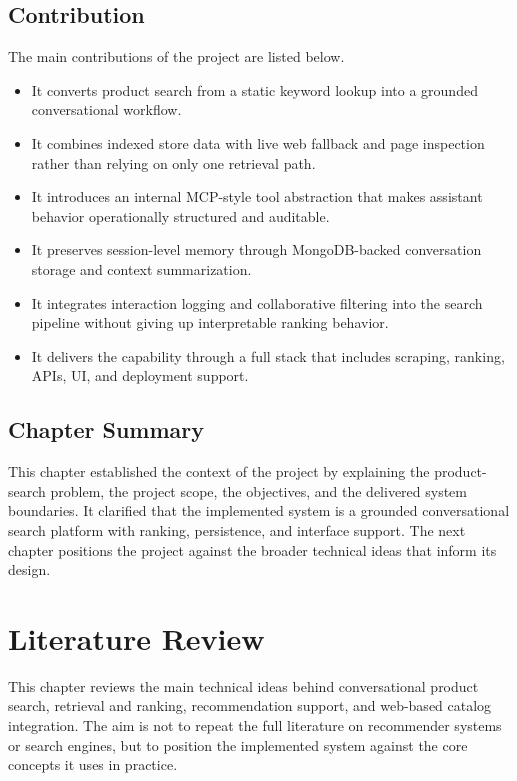 \documentclass[12pt,a4paper,oneside]{report}
\begin{document}
\section{Contribution}
The main contributions of the project are listed below.
\begin{itemize}[leftmargin=0.35in]
    \item It converts product search from a static keyword lookup into a grounded conversational workflow.
    \item It combines indexed store data with live web fallback and page inspection rather than relying on only one retrieval path.
    \item It introduces an internal MCP-style tool abstraction that makes assistant behavior operationally structured and auditable.
    \item It preserves session-level memory through MongoDB-backed conversation storage and context summarization.
    \item It integrates interaction logging and collaborative filtering into the search pipeline without giving up interpretable ranking behavior.
    \item It delivers the capability through a full stack that includes scraping, ranking, APIs, UI, and deployment support.
\end{itemize}

\section{Chapter Summary}
This chapter established the context of the project by explaining the product-search problem, the project scope, the objectives, and the delivered system boundaries. It clarified that the implemented system is a grounded conversational search platform with ranking, persistence, and interface support. The next chapter positions the project against the broader technical ideas that inform its design.

\chapter{Literature Review}

This chapter reviews the main technical ideas behind conversational product search, retrieval and ranking, recommendation support, and web-based catalog integration. The aim is not to repeat the full literature on recommender systems or search engines, but to position the implemented system against the core concepts it uses in practice.
\end{document}
